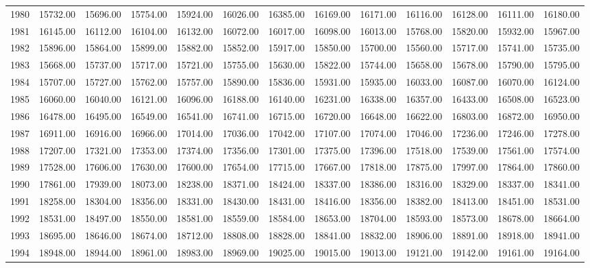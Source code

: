 \begin{longtable}{rrrrrrrrrrrrr}
  1980 & 15732.00 & 15696.00 & 15754.00 & 15924.00 & 16026.00 & 16385.00 & 16169.00 & 16171.00 & 16116.00 & 16128.00 & 16111.00 & 16180.00 \\ 
  1981 & 16145.00 & 16112.00 & 16104.00 & 16132.00 & 16072.00 & 16017.00 & 16098.00 & 16013.00 & 15768.00 & 15820.00 & 15932.00 & 15967.00 \\ 
  1982 & 15896.00 & 15864.00 & 15899.00 & 15882.00 & 15852.00 & 15917.00 & 15850.00 & 15700.00 & 15560.00 & 15717.00 & 15741.00 & 15735.00 \\ 
  1983 & 15668.00 & 15737.00 & 15717.00 & 15721.00 & 15755.00 & 15630.00 & 15822.00 & 15744.00 & 15658.00 & 15678.00 & 15790.00 & 15795.00 \\ 
  1984 & 15707.00 & 15727.00 & 15762.00 & 15757.00 & 15890.00 & 15836.00 & 15931.00 & 15935.00 & 16033.00 & 16087.00 & 16070.00 & 16124.00 \\ 
  1985 & 16060.00 & 16040.00 & 16121.00 & 16096.00 & 16188.00 & 16140.00 & 16231.00 & 16338.00 & 16357.00 & 16433.00 & 16508.00 & 16523.00 \\ 
  1986 & 16478.00 & 16495.00 & 16549.00 & 16541.00 & 16741.00 & 16715.00 & 16720.00 & 16648.00 & 16622.00 & 16803.00 & 16872.00 & 16950.00 \\ 
  1987 & 16911.00 & 16916.00 & 16966.00 & 17014.00 & 17036.00 & 17042.00 & 17107.00 & 17074.00 & 17046.00 & 17236.00 & 17246.00 & 17278.00 \\ 
  1988 & 17207.00 & 17321.00 & 17353.00 & 17374.00 & 17356.00 & 17301.00 & 17375.00 & 17396.00 & 17518.00 & 17539.00 & 17561.00 & 17574.00 \\ 
  1989 & 17528.00 & 17606.00 & 17630.00 & 17600.00 & 17654.00 & 17715.00 & 17667.00 & 17818.00 & 17875.00 & 17997.00 & 17864.00 & 17860.00 \\ 
  1990 & 17861.00 & 17939.00 & 18073.00 & 18238.00 & 18371.00 & 18424.00 & 18337.00 & 18386.00 & 18316.00 & 18329.00 & 18337.00 & 18341.00 \\ 
  1991 & 18258.00 & 18304.00 & 18356.00 & 18331.00 & 18430.00 & 18431.00 & 18416.00 & 18356.00 & 18382.00 & 18413.00 & 18451.00 & 18531.00 \\ 
  1992 & 18531.00 & 18497.00 & 18550.00 & 18581.00 & 18559.00 & 18584.00 & 18653.00 & 18704.00 & 18593.00 & 18573.00 & 18678.00 & 18664.00 \\ 
  1993 & 18695.00 & 18646.00 & 18674.00 & 18712.00 & 18808.00 & 18828.00 & 18841.00 & 18832.00 & 18906.00 & 18891.00 & 18918.00 & 18941.00 \\ 
  1994 & 18948.00 & 18944.00 & 18961.00 & 18983.00 & 18969.00 & 19025.00 & 19015.00 & 19013.00 & 19121.00 & 19142.00 & 19161.00 & 19164.00 \\ 

\end{longtable}
